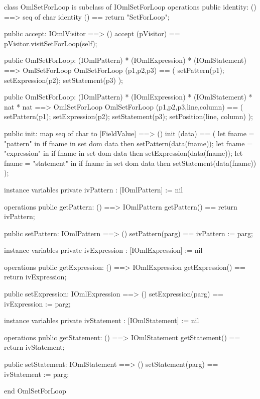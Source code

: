 \begin{vdm_al}
class OmlSetForLoop is subclass of IOmlSetForLoop
operations
  public identity: () ==> seq of char
  identity () == return "SetForLoop";

  public accept: IOmlVisitor ==> ()
  accept (pVisitor) == pVisitor.visitSetForLoop(self);

  public OmlSetForLoop:
    (IOmlPattern) *
    (IOmlExpression) *
    (IOmlStatement) ==> OmlSetForLoop
  OmlSetForLoop (p1,p2,p3) == 
    ( setPattern(p1);
      setExpression(p2);
      setStatement(p3) );

  public OmlSetForLoop:
    (IOmlPattern) *
    (IOmlExpression) *
    (IOmlStatement) *
    nat *
    nat ==> OmlSetForLoop
  OmlSetForLoop (p1,p2,p3,line,column) == 
    ( setPattern(p1);
      setExpression(p2);
      setStatement(p3);
      setPosition(line, column) );

  public init: map seq of char to [FieldValue] ==> ()
  init (data) ==
    ( let fname = "pattern" in
        if fname in set dom data
        then setPattern(data(fname));
      let fname = "expression" in
        if fname in set dom data
        then setExpression(data(fname));
      let fname = "statement" in
        if fname in set dom data
        then setStatement(data(fname)) );

instance variables
  private ivPattern : [IOmlPattern] := nil

operations
  public getPattern: () ==> IOmlPattern
  getPattern() == return ivPattern;

  public setPattern: IOmlPattern ==> ()
  setPattern(parg) == ivPattern := parg;

instance variables
  private ivExpression : [IOmlExpression] := nil

operations
  public getExpression: () ==> IOmlExpression
  getExpression() == return ivExpression;

  public setExpression: IOmlExpression ==> ()
  setExpression(parg) == ivExpression := parg;

instance variables
  private ivStatement : [IOmlStatement] := nil

operations
  public getStatement: () ==> IOmlStatement
  getStatement() == return ivStatement;

  public setStatement: IOmlStatement ==> ()
  setStatement(parg) == ivStatement := parg;

end OmlSetForLoop
\end{vdm_al}

